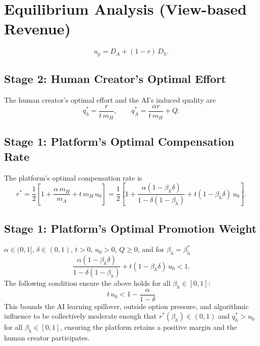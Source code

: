 \documentclass[mnsc,nonblindrev]{informs3_NoOR}
\begin{document}

\section{Equilibrium Analysis (View-based Revenue)}
\label{sec:analysis}
\begin{equation}
    u_p = D_A + (1-r)\,D_h.
    \label{eq:up}
\end{equation}

\subsection{Stage 2: Human Creator's Optimal Effort}

\begin{proposition}
\label{prop:qh}
The human creator's optimal effort and the AI's induced quality are
\begin{equation}
    q_h^* = \frac{r}{t\,m_H}, \qquad
    q_A^* = \frac{\alpha r}{t\,m_H} + Q.
    \label{eq:qhstar}
\end{equation}
\end{proposition}

\subsection{Stage 1: Platform's Optimal Compensation Rate}

\begin{proposition}
\label{prop:rstar}
The platform's optimal compensation rate is
\begin{equation}
    r^* = \frac{1}{2}\left[1 + \frac{\alpha\,m_H}{m_A} + t\,m_H\,u_0\right]
        = \frac{1}{2}\left[1 + \frac{\alpha(1-\beta_h\delta)}{1-\delta(1-\beta_h)} + t(1-\beta_h\delta)\,u_0\right].
    \label{eq:rstar}
\end{equation}
\end{proposition}


\subsection{Stage 1: Platform's Optimal Promotion Weight}


\begin{assumption}\label{ass:params}
$\alpha \in (0,1]$, $\delta \in (0,1)$, $t > 0$, $u_0 > 0$, $Q \ge 0$, and for $\beta_h = \beta_h^*$
\[
\frac{\alpha(1-\beta_h\delta)}{1-\delta(1-\beta_h)} + t(1-\beta_h\delta)\,u_0 < 1.
\]
The following condition ensure the above holds for all $\beta_h \in [0,1]$:
\[
 t\,u_0 < 1 - \frac{\alpha}{1-\delta}
\]
This bounds the AI learning spillover, outside option pressure, and algorithmic influence to be collectively moderate enough that $r^*(\beta_h) \in (0,1)$ and $q_h^* > u_0$ for all $\beta_h \in [0,1]$, ensuring the platform retains a positive margin and the human creator participates.
\end{assumption}
\end{document}
